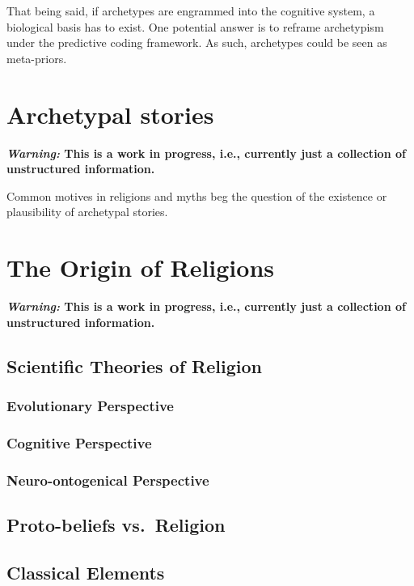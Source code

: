 \documentclass[
]{book}
\begin{document}
That being said, if archetypes are engrammed into the cognitive system, a biological basis has to exist. One potential answer is to reframe archetypism under the predictive coding framework. As such, archetypes could be seen as meta-priors.

\hypertarget{archetypal-stories}{%
\chapter{Archetypal stories}\label{archetypal-stories}}

\textbf{\emph{Warning:} This is a work in progress, i.e., currently just a collection of unstructured information.}

Common motives in religions and myths beg the question of the existence or plausibility of archetypal stories.

\hypertarget{the-origin-of-religions}{%
\chapter{The Origin of Religions}\label{the-origin-of-religions}}

\textbf{\emph{Warning:} This is a work in progress, i.e., currently just a collection of unstructured information.}

\hypertarget{scientific-theories-of-religion}{%
\section{Scientific Theories of Religion}\label{scientific-theories-of-religion}}

\hypertarget{evolutionary-perspective}{%
\subsection{Evolutionary Perspective}\label{evolutionary-perspective}}

\hypertarget{cognitive-perspective}{%
\subsection{Cognitive Perspective}\label{cognitive-perspective}}

\hypertarget{neuro-ontogenical-perspective}{%
\subsection{Neuro-ontogenical Perspective}\label{neuro-ontogenical-perspective}}

\hypertarget{proto-beliefs-vs.-religion}{%
\section{Proto-beliefs vs.~Religion}\label{proto-beliefs-vs.-religion}}

\hypertarget{classical-elements}{%
\section{Classical Elements}\label{classical-elements}}

  
\end{document}
